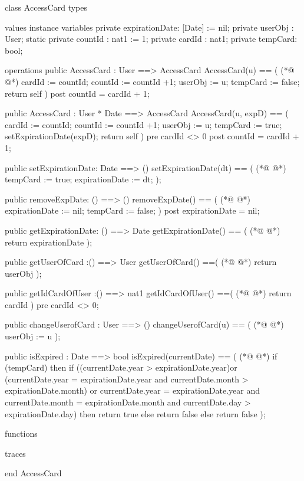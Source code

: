 \begin{vdmpp}[breaklines=true]
class AccessCard
types

values
instance variables
  private expirationDate: [Date] := nil; 
  private userObj : User;
  static private countId : nat1 := 1;
  private cardId : nat1;
  private tempCard: bool;
  
  
operations
  public AccessCard : User ==> AccessCard
  AccessCard(u) == (
(*@
\label{AccessCard:16}
@*)
  cardId := countId;
  countId := countId +1;
  userObj := u;
  tempCard := false;
  return self
  )
  post countId = cardId + 1;
  
  public AccessCard : User * Date ==> AccessCard 
  AccessCard(u, expD) == (
   cardId := countId;
  countId := countId +1;
  userObj := u;
  tempCard := true;
  setExpirationDate(expD);
  return self
  )
  pre cardId <> 0
  post countId = cardId + 1;
  
  public setExpirationDate: Date ==> ()
   setExpirationDate(dt) == (
(*@
\label{setExpirationDate:38}
@*)
    tempCard := true;
   expirationDate := dt;
   );
   
  public removeExpDate: () ==> ()
   removeExpDate() == (
(*@
\label{removeExpDate:44}
@*)
   expirationDate := nil;
   tempCard := false;
   )
   post expirationDate = nil;
   
  public getExpirationDate: () ==> Date
   getExpirationDate() == (
(*@
\label{getExpirationDate:51}
@*)
   return expirationDate
   );
   
 public getUserOfCard :() ==> User
  getUserOfCard() ==(
(*@
\label{getUserOfCard:56}
@*)
  return userObj
  );
  
 public getIdCardOfUser :() ==> nat1
  getIdCardOfUser() ==(
(*@
\label{getIdCardOfUser:61}
@*)
  return cardId
  )
  pre cardId <> 0;

 public changeUserofCard : User ==> ()
  changeUserofCard(u) == (
(*@
\label{changeUserofCard:67}
@*)
  userObj := u
  );
  
  public isExpired : Date ==> bool
  isExpired(currentDate) == (
(*@
\label{isExpired:72}
@*)
  if (tempCard) then
   if ((currentDate.year > expirationDate.year)or
    (currentDate.year = expirationDate.year and currentDate.month > expirationDate.month) or
     currentDate.year = expirationDate.year and currentDate.month = expirationDate.month and
     currentDate.day > expirationDate.day)
     then return true
    else return false
   else return false
  );
  
functions

traces

end AccessCard
\end{vdmpp}
